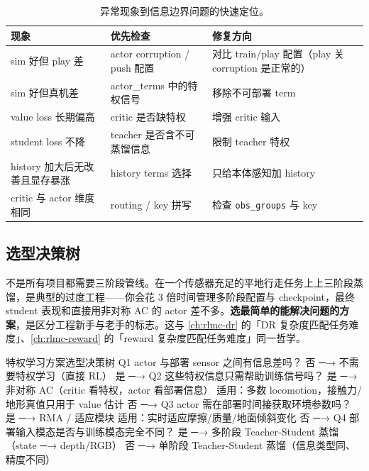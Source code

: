 \begin{table}[H]
\centering
\small
\caption{异常现象到信息边界问题的快速定位。}
\label{tab:rlmc-priv-diag}
\begin{tabular}{@{}p{3.4cm}p{4.0cm}p{4.2cm}@{}}
\toprule
现象 & 优先检查 & 修复方向 \\
\midrule
sim 好但 play 差 & actor corruption / push 配置 & 对比 train/play 配置（play 关 corruption 是正常的） \\
sim 好但真机差 & actor\_terms 中的特权信号 & 移除不可部署 term \\
value loss 长期偏高 & critic 是否缺特权 & 增强 critic 输入 \\
student loss 不降 & teacher 是否含不可蒸馏信息 & 限制 teacher 特权 \\
history 加大后无改善且显存暴涨 & history terms 选择 & 只给本体感知加 history \\
critic 与 actor 维度相同 & routing / key 拼写 & 检查 \texttt{obs\_groups} 与 key \\
\bottomrule
\end{tabular}
\end{table}

\subsection{选型决策树}
\label{sec:rlmc-priv-tree}

\begin{insight}[选最简单的够用方案]\label{ins:rlmc-priv-simplest}
不是所有项目都需要三阶段管线。在一个传感器充足的平地行走任务上上三阶段蒸馏，是典型的过度工程——你会花 3 倍时间管理多阶段配置与 checkpoint，最终 student 表现和直接用非对称 AC 的 actor 差不多。\textbf{选最简单的能解决问题的方案}，是区分工程新手与老手的标志。这与 \cref{ch:rlmc-dr} 的「DR 复杂度匹配任务难度」、\cref{ch:rlmc-reward} 的「reward 复杂度匹配任务难度」同一哲学。
\end{insight}

\begin{codebox}[text]{特权学习方案选型决策树}
Q1 actor 与部署 sensor 之间有信息差吗？
   否 ─→ 不需要特权学习（直接 RL）
   是 ─→ Q2 这些特权信息只需帮助训练信号吗？
          是 ─→ 非对称 AC（critic 看特权，actor 看部署信息）
                 适用：多数 locomotion，接触力/地形真值只用于 value 估计
          否 ─→ Q3 actor 需在部署时间接获取环境参数吗？
                 是 ─→ RMA / 适应模块
                        适用：实时适应摩擦/质量/地面倾斜变化
                 否 ─→ Q4 部署输入模态是否与训练模态完全不同？
                        是 ─→ 多阶段 Teacher-Student 蒸馏（state ─→ depth/RGB）
                        否 ─→ 单阶段 Teacher-Student 蒸馏（信息类型同、精度不同）
\end{codebox}

